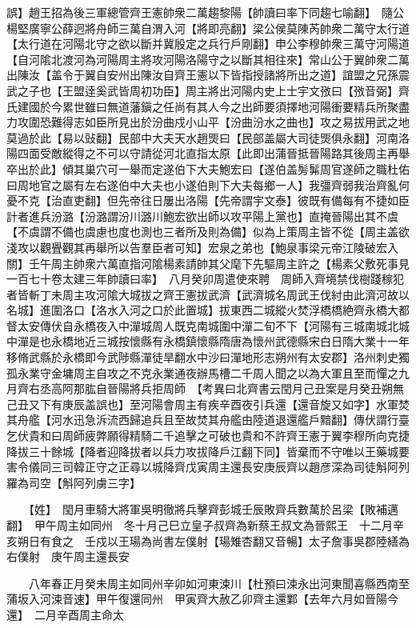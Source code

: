 誤】趙王招為後三軍總管齊王憲帥衆二萬趨黎陽【帥讀曰率下同趨七喻翻】　隨公楊堅廣寧公薛迥將舟師三萬自渭入河【將即亮翻】梁公侯莫陳芮帥衆二萬守太行道【太行道在河陽北守之欲以斷并冀殷定之兵行戶剛翻】申公李穆帥衆三萬守河陽道【自河隂北渡河為河陽周主將攻河陽洛陽守之以斷其相往來】常山公于翼帥衆二萬出陳汝【盖令于翼自安州出陳汝自齊王憲以下皆指授諸將所出之道】誼盟之兄孫震武之子也【王盟逹奚武皆周初功臣】周主將出河陽内史上士宇文㢸曰【㢸音弼】齊氏建國於今累世雖曰無道藩鎭之任尚有其人今之出師要須擇地河陽衝要精兵所聚盡力攻圍恐難得志如臣所見出於汾曲戍小山平【汾曲汾水之曲也】攻之易拔用武之地莫過於此【易以䜴翻】民部中大夫天水趙煚曰【民部盖屬大司徒煚俱永翻】河南洛陽四面受敵縱得之不可以守請從河北直指太原【此即出蒲晉抵晉陽路其後周主再舉卒出於此】傾其巢穴可一舉而定遂伯下大夫鮑宏曰【遂伯盖髣髴周官遂師之職杜佑曰周地官之屬有左右遂伯中大夫也小遂伯則下大夫每鄉一人】我彊齊弱我治齊亂何憂不克【治直吏翻】但先帝往日屢出洛陽【先帝謂宇文泰】彼既有備每有不捷如臣計者進兵汾潞【汾潞謂汾川潞川鮑宏欲出師以攻平陽上黨也】直掩晉陽出其不虞【不虞謂不備也虞慮也度也測也三者所及則為備】似為上策周主皆不從【周主盖欲淺攻以觀舋觀其再舉所以告羣臣者可知】宏泉之弟也【鮑泉事梁元帝江陵破宏入關】壬午周主帥衆六萬直指河隂楊素請帥其父麾下先驅周主許之【楊素父敷死事見一百七十卷太建三年帥讀曰率】　八月癸卯周遣使來聘　周師入齊境禁伐樹踐稼犯者皆斬丁未周主攻河隂大城拔之齊王憲拔武濟【武濟城名周武王伐紂由此濟河故以名城】進圍洛口【洛水入河之口於此置城】拔東西二城縱火焚浮橋橋絶齊永橋大都督太安傳伏自永橋夜入中潬城周人既克南城圍中潬二旬不下【河陽有三城南城北城中潬是也永橋地近三城按懷縣有永橋鎮懷縣隋唐為懷州武德縣宋白日隋大業十一年移脩武縣於永橋即今武陟縣潬徒旱翻水中沙曰潬地形志朔州有太安郡】洛州刺史獨孤永業守金墉周主自攻之不克永業通夜辦馬槽二千周人聞之以為大軍且至而憚之九月齊右丞高阿那肱自晉陽將兵拒周師　【考異曰北齊書云閏月己丑案是月癸丑朔無己丑又下有庚辰盖誤也】至河陽會周主有疾辛酉夜引兵還【還音旋又如字】水軍焚其舟艦【河水迅急泝流西歸追兵且至故焚其舟艦由陸道退還艦戶黯翻】傳伏謂行臺乞伏貴和曰周師疲弊願得精騎二千追擊之可破也貴和不許齊王憲于翼李穆所向克捷降拔三十餘城【降者迎降拔者以兵力攻拔降戶江翻下同】皆棄而不守唯以王藥城要害令儀同三司韓正守之正尋以城降齊戊寅周主還長安庚辰齊以趙彦深為司徒斛阿列羅為司空【斛阿列虜三字】

　　【姓】　閠月車騎大將軍吳明徹將兵擊齊彭城壬辰敗齊兵數萬於呂梁【敗補邁翻】　甲午周主如同州　冬十月己巳立皇子叔齊為新蔡王叔文為晉熙王　十二月辛亥朔日有食之　壬戍以王瑒為尚書左僕射【瑒雉杏翻又音暢】太子詹事吳郡陸繕為右僕射　庚午周主還長安

　　八年春正月癸未周主如同州辛卯如河東涑川【杜預曰涑永出河東聞喜縣西南至蒲坂入河涑音速】甲午復還同州　甲寅齊大赦乙卯齊主還鄴【去年六月如晉陽今還】　二月辛酉周主命太

